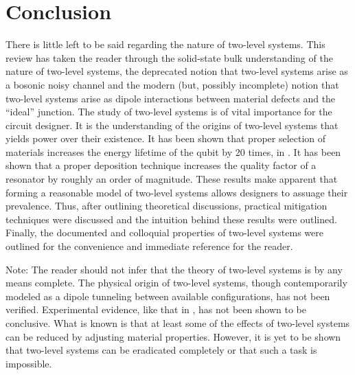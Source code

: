 \documentclass[aps,prl,reprint,groupedaddress]{revtex4-1}
\begin{document}
\section{Conclusion}
There is little left to be said regarding the nature of two-level systems. This review has taken the reader through the solid-state bulk understanding of the nature of two-level systems, the deprecated notion that two-level systems arise as a bosonic noisy channel and the modern (but, possibly incomplete) notion that two-level systems arise as dipole interactions between material defects and the ``ideal'' junction. The study of two-level systems is of vital importance for the circuit designer. It is the understanding of the origins of two-level systems that yields power over their existence. It has been shown that proper selection of materials increases the energy lifetime of the qubit by 20 times, in \cite{martinis_decoherence_2005}. It has been shown that a proper deposition technique increases the quality factor of a resonator by roughly an order of magnitude. These results make apparent that forming a reasonable model of two-level systems allows designers to assuage their prevalence. Thus, after outlining theoretical discussions, practical mitigation techniques were discussed and the intuition behind these results were outlined. Finally, the documented and colloquial properties of two-level systems were outlined for the convenience and immediate reference for the reader.

Note: The reader should not infer that the theory of two-level systems is by any means complete. The physical origin of two-level systems, though contemporarily modeled as a dipole tunneling between available configurations, has not been verified. Experimental evidence, like that in \cite{martinis_decoherence_2005}, has not been shown to be conclusive. What is known is that at least some of the effects of two-level systems can be reduced by adjusting material properties. However, it is yet to be shown that two-level systems can be eradicated completely or that such a task is impossible. 

\subsection{}
\subsubsection{}
\end{document}
